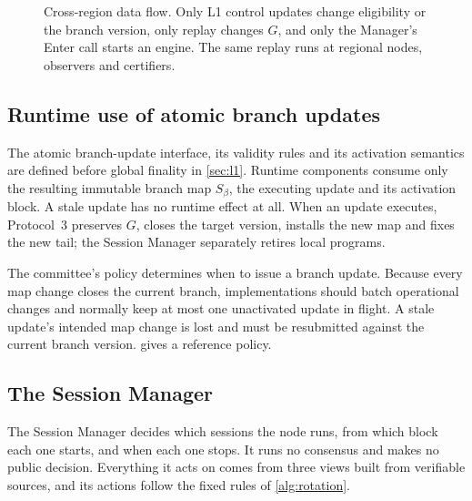 \documentclass[11pt,a4paper]{article}
\begin{document}
\begin{figure}[p]\centering

\caption{Cross-region data flow. Only L1 control updates change
eligibility or the branch version, only replay changes $G$, and only the
Manager's Enter call starts an engine. The same replay runs at regional
nodes, observers and certifiers.}
\label{fig:runtime-modules}
\end{figure}
\FloatBarrier

\subsection{Runtime use of atomic branch updates}
The atomic branch-update interface, its validity rules and its activation
semantics are defined before global finality in \cref{sec:l1}.  Runtime
components consume only the resulting immutable branch map $S_\beta$,
the executing update and its activation block.  A stale update has no
runtime effect at all.  When an update executes, Protocol~3 preserves
$G$, closes the target version, installs the new map and fixes the new
tail; the Session Manager separately retires local programs.

The committee's policy determines when to issue a branch update.
Because every map change closes the current branch, implementations
should batch operational changes and normally keep at most one
unactivated update in flight.  A stale update's intended map change is
lost and must be resubmitted against the current branch version.
 gives a reference policy.

\subsection{The Session Manager}
\label{sec:session-manager}
The Session Manager decides which sessions the node runs, from which
block each one starts, and when each one stops. It runs no consensus and
makes no public decision. Everything it acts on comes from three views
built from verifiable sources, and its actions follow the fixed rules of
\cref{alg:rotation}.
\end{document}
